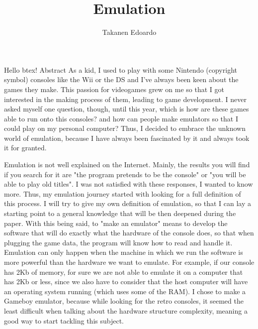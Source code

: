 \documentclass{article}
\title{Emulation}
\author{Takanen Edoardo}
\begin{document}
\maketitle
Hello btex!
Abstract As a kid, I used to play with some Nintendo (copyright symbol) consoles like the Wii or the DS and I've always been keen about the games they make. This passion for videogames grew on me so that I got interested in the making process of them, leading to game development. I never asked myself one question, though, until this year, which is how are these games able to run onto this consoles? and how can people make emulators so that I could play on my personal computer? Thus, I decided to embrace the unknown world of emulation, because I have always been fascinated by it and always took it for granted.

\newpage
Emulation is not well explained on the Internet. Mainly, the results you will find if you search for it are "the program pretends to be the console" or "you will be able to play old titles". I was not satisfied with these responses, I wanted to know more. Thus, my emulation journey started with looking for a full definition of this process. I will try to give my own definition of emulation, so that I can lay a starting point to a general knowledge that will be then deepened during the paper. With this being said, to "make an emulator" means to develop the software that will do exactly what the hardware of the console does, so that when plugging the game data, the program will know how to read and handle it. \\
Emulation can only happen when the machine in which we run the software is more powerful than the hardware we want to emulate. For example, if our console has 2Kb of memory, for sure we are not able to emulate it on a computer that has 2Kb or less, since we also have to consider that the host computer will have an operating system running (which uses some of the RAM). I chose to make a Gameboy emulator, because while looking for the retro consoles, it seemed the least difficult when talking about the hardware structure complexity, meaning a good way to start tackling this subject.
\end{document}
